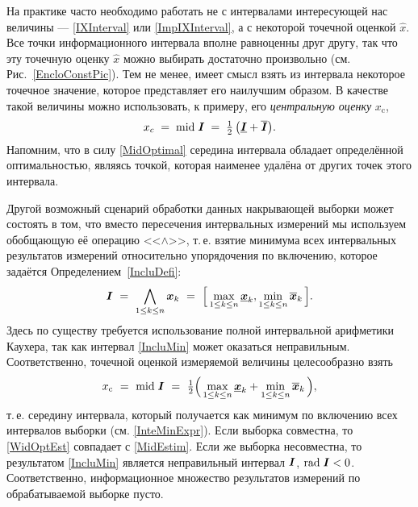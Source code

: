 \documentclass[a5paper,openany]{book}
\newcommand{\mbf}[1]{\protect\text{\boldmath$#1$}}
\newcommand{\ov}{\overline}
\newcommand{\un}{\underline}
\newcommand{\m}{\mathrm{mid}\;}
\renewcommand{\r}{\mathrm{rad}\;}
\newcounter{IncluDefi}
\begin{document}
  
На практике часто необходимо работать не с интервалами интересующей нас величины --- 
\eqref{IXInterval} или \eqref{ImpIXInterval}, а с некоторой точечной оценкой $\hat{x}$. 
Все точки информационного интервала вполне равноценны друг другу, так что эту точечную 
оценку $\hat{x}$ можно выбирать достаточно произвольно (см. Рис.~\ref{EncloConstPic}). 
Тем не менее, имеет смысл взять из интервала некоторое точечное значение, которое 
представляет его наилучшим образом. В качестве такой величины можно использовать, 
к примеру, его \textit{центральную оценку} $x_{\text{c}}$, 
\begin{equation}
\label{MidEstim}
x_{c} \; = \;\m\mbf{I}\; = \;\tfrac{1}{2}\,\bigl(\un{\mbf{I}} + \ov{\mbf{I}}\bigr). 
\end{equation} 
Напомним, что в силу \eqref{MidOptimal} середина интервала обладает определённой 
оптимальностью, являясь точкой, которая наименее удалёна от других точек этого 
интервала.               
  
Другой возможный сценарий обработки данных накрывающей выборки может состоять в том, 
что вместо пересечения интервальных измерений мы используем обобщающую её операцию 
<<$\wedge$>>, т.\,е. взятие минимума всех интервальных результатов измерений 
относительно упорядочения по включению, которое задаётся Определением~\ref{IncluDefi}: 
\begin{equation}
\label{IncluMin} 
\mbf{I} \  = \   
\bigwedge_{1\leq k\leq n} \mbf{x}_{k} \   = \  
\Bigl[\,\max_{1\leq k\leq n} \un{\mbf{x}}_{k}, 
    \min_{1\leq k\leq n} \ov{\mbf{x}}_{k}\,\Bigr].  
\end{equation} 
Здесь по существу требуется использование полной интервальной арифметики Каухера, 
так как интервал \eqref{IncluMin} может оказаться неправильным. Соответственно, 
точечной оценкой измеряемой величины целесообразно взять 
\begin{equation}
\label{WidOptEst} 
x_\text{c} \  = \  \m\mbf{I} \  
   = \  \tfrac{1}{2}\Bigl(\,\max_{1\leq k\leq n} \un{\mbf{x}}_{k} 
                          + \min_{1\leq k\leq n} \ov{\mbf{x}}_{k}\,\Bigr), 
\end{equation} 
т.\,е. середину интервала, который получается как минимум по включению всех интервалов 
выборки (см. \eqref{InteMinExpr}). Если выборка совместна, то \eqref{WidOptEst} совпадает 
с \eqref{MidEstim}. Если же выборка несовместна, то результатом \eqref{IncluMin} является 
неправильный интервал $\mbf{I}$, $\r\mbf{I} < 0$. Соответственно, информационное 
множество результатов измерений по обрабатываемой выборке пусто. 
  
\end{document}
